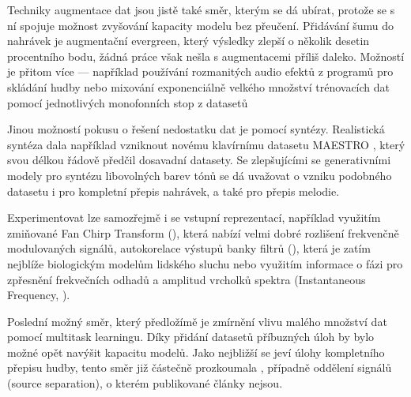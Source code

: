 Techniky augmentace dat jsou jistě také směr, kterým se dá ubírat, protože se s ní spojuje možnost zvyšování kapacity modelu bez přeučení. Přidávání šumu do nahrávek je augmentační evergreen, který výsledky zlepší o několik desetin procentního bodu, žádná práce však nešla s augmentacemi příliš daleko. Možností je přitom více --- například používání rozmanitých audio efektů z programů pro skládání hudby nebo mixování exponenciálně velkého množství trénovacích dat pomocí jednotlivých monofonních stop z datasetů 

Jinou možností pokusu o řešení nedostatku dat je pomocí syntézy. Realistická syntéza dala například vzniknout novému klavírnímu datasetu MAESTRO \citep{Hawthorne2018a}, který svou délkou řádově předčil dosavadní datasety. Se zlepšujícími se generativními modely pro syntézu libovolných barev tónů \citep{Engel2019} se dá uvažovat o vzniku podobného datasetu i pro kompletní přepis nahrávek, a také pro přepis melodie.

Experimentovat lze samozřejmě i se vstupní reprezentací, například využitím zmiňované Fan Chirp Transform (\cite{Cancela2010}), která nabízí velmi dobré rozlišení frekvenčně modulovaných signálů, autokorelace výstupů banky filtrů (\cite{Paiva2006}), která je zatím nejblíže biologickým modelům lidského sluchu nebo využitím informace o fázi pro zpřesnění frekvečních odhadů a amplitud vrcholků spektra (Instantaneous Frequency, \cite{Dressler2009}).

Poslední možný směr, který předložímě je zmírnění vlivu malého množství dat pomocí multitask learningu. Díky přidání datasetů příbuzných úloh by bylo možné opět navýšit kapacitu modelů. Jako nejbližší se jeví úlohy kompletního přepisu hudby, tento směr již částečně prozkoumala \cite{Bittner2018}, případně oddělení signálů (source separation), o kterém publikované články nejsou. 

